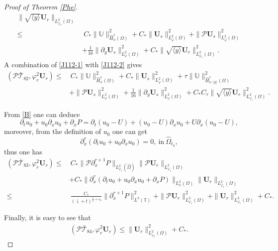 \documentclass{amsart}
\numberwithin{equation}{section}
\newcommand\y{{{\langle y \rangle}}}
\begin{document}
\begin{proof}[Proof of Theorem \ref{Phe}]
\begin{align}
        \|\sqrt{\y}\mathbf{U}_{r}\|_{L_{\varphi_{r}}^{2}(\Omega)}\nonumber\\
\leq&~C_{*}\|\mathbb{U}\|_{\hat{H}_{\psi}^{s}(\Omega)}^{2}
     +C_{*}\|\mathbf{U}_{s}\|_{L_{\varphi}^{2}(\Omega)}^{2}
     +\|\mathcal{P}\mathbf{U}_{s}\|_{L_{\varphi}^{2}(\Omega)}^{2}\nonumber\\
    &+\frac{1}{16}\|\partial_{y}\mathbf{U}_{s}\|_{L_{\varphi}^{2}(\Omega)}^{2}
     +C_{*}\|\sqrt{\y}\mathbf{U}_{r}\|_{L_{\varphi_{r}}^{2}(\Omega)}^{2}.\nonumber
\end{align}
A combination of \eqref{J112-1} with \eqref{J112-2} gives
\begin{align}\label{J112}
(\mathcal{P}\bar{\mathcal{T}}_{82},\varphi_{r}^{2}\mathbf{U}_{r})
\leq&~C_{*}\|\mathbb{U}\|_{\hat{H}_{\psi}^{s}(\Omega)}^{2}
     +C_{*}\|\mathbf{U}_{s}\|_{L_{\varphi}^{2}(\Omega)}^{2}
     +\tau\|\mathbb{U}\|_{\hat{H}_{\psi,\y}^{s}(\Omega)}^{2}\\
    &+\|\mathcal{P}\mathbf{U}_{s}\|_{L_{\varphi}^{2}(\Omega)}^{2}
     +\frac{1}{16}\|\partial_{y}\mathbf{U}_{s}\|_{L_{\varphi}^{2}(\Omega)}^{2}
     +C_{*}C_{\tau}\|\sqrt{\y}\mathbf{U}_{r}\|_{L_{\varphi_{r}}^{2}(\Omega)}^{2}.\nonumber
\end{align}

From \eqref{B} one can deduce
$$\partial_{t}u_{0}+u_{0}\partial_{x}u_{0}+\partial_{x}P=\partial_{t}(u_{0}-U)+(u_{0}-U)\partial_{x}u_{0}+U\partial_{x}(u_{0}-U),$$
moreover, from the definition of $u_{0}$ one can get
$$\partial_{x}^{r}(\partial_{t}u_{0}+u_{0}\partial_{x}u_{0})=0,~\text{in}~\hat{\Omega}_{t_{3}},$$
thus one has
\begin{align}\label{J113}
(\mathcal{P}\bar{\mathcal{T}}_{83},\varphi_{r}^{2}\mathbf{U}_{r})
\leq&~C_{*}\|\mathcal{P}\partial_{x}^{r+1}P\|_{L_{\varphi_{r}}^{2}(\hat{\Omega})}\|\mathcal{P}\mathbf{U}_{r}\|_{L_{\varphi_{r}}^{2}(\Omega)}\\
    &+C_{*}\|\partial_{x}^{r}(\partial_{t}u_{0}+u_{0}\partial_{x}u_{0}+\partial_{x}P)\|_{L_{\psi}^{2}(\Omega)}\|\mathbf{U}_{r}\|_{L_{\varphi_{r}}^{2}(\Omega)}\nonumber\\
\leq&~\frac{C_{*}}{(\bar{\varsigma}+t)^{\frac{1}{2}+\varepsilon_{0}}}\|\partial_{x}^{r+1}P\|_{L^{2}(\mathbb{T})}^{2}
     +\|\mathcal{P}\mathbf{U}_{r}\|_{L_{\varphi_{r}}^{2}(\Omega)}^{2}
     +\|\mathbf{U}_{r}\|_{L_{\varphi_{r}}^{2}(\Omega)}^{2}
     +C_{*}.\nonumber
\end{align}

Finally, it is easy to see that
\begin{align}\label{J114}
(\mathcal{P}\bar{\mathcal{T}}_{84},\varphi_{r}^{2}\mathbf{U}_{r})
\leq \|\mathbf{U}_{r}\|_{L_{\varphi_{r}}^{2}(\Omega)}^{2}
    +C_{*}.
\end{align}


\end{proof}
\end{document}
